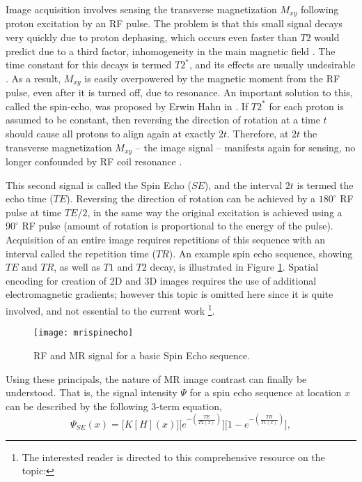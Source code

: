 Image acquisition involves sensing the transverse magnetization $M_{xy}$ following proton excitation by an RF pulse.
The problem is that this small signal decays very quickly due to proton dephasing, which occurs even faster than $T2$ would predict due to a third factor, inhomogeneity in the main magnetic field \cite{Chavhan2009}.
The time constant for this decays is termed $T2^*$, and its effects are usually undesirable \cite{Chavhan2009}.
As a result, $M_{xy}$ is easily overpowered by the magnetic moment from the RF pulse, even after it is turned off, due to resonance.
An important solution to this, called the spin-echo, was proposed by Erwin Hahn in \citeyear{Hahn1950} \cite{Hahn1950}.
If $T2^*$ for each proton is assumed to be constant, then reversing the direction of rotation at a time $t$ should cause all protons to align again at exactly $2t$.
Therefore, at $2t$ the transverse magnetization $M_{xy}$ -- the image signal -- manifests again for sensing, no longer confounded by RF coil resonance \cite{Hahn1950}.
\par
This second signal is called the Spin Echo ($SE$), and the interval $2t$ is termed the echo time ($TE$).
Reversing the direction of rotation can be achieved by a $180^{\circ}$ RF pulse at time $TE/2$, in the same way the original excitation is achieved using a $90^{\circ}$ RF pulse (amount of rotation is proportional to the energy of the pulse).
Acquisition of an entire image requires repetitions of this sequence with an interval called the repetition time ($TR$).
An example spin echo sequence, showing $TE$ and $TR$, as well as $T1$ and $T2$ decay, is illustrated in Figure \ref{fig:mrispinecho}.
Spatial encoding for creation of 2D and 3D images requires the use of additional electromagnetic gradients; however this topic is omitted here since it is quite involved, and not essential to the current work%
\footnote{The interested reader is directed to this comprehensive resource on the topic: }.
\par
\begin{figure}
  \centering\texttt{[image: mrispinecho]}
  \caption{RF and MR signal for a basic Spin Echo sequence.}
  \label{fig:mrispinecho}
\end{figure}
Using these principals, the nature of MR image contrast can finally be understood.
That is, the signal intensity $\Psi$ for a spin echo sequence at location $x$ can be described by the following 3-term equation,
\begin{equation}\label{eq:MRI-SE}
\Psi_{SE}(x) = \bigg[K [H](x)\bigg]\bigg[e^{-\left(\frac{TE}{T2(x)}\right)}\bigg]\bigg[1 - e^{-\left(\frac{TR}{T1(x)}\right)}\bigg],
\end{equation}
